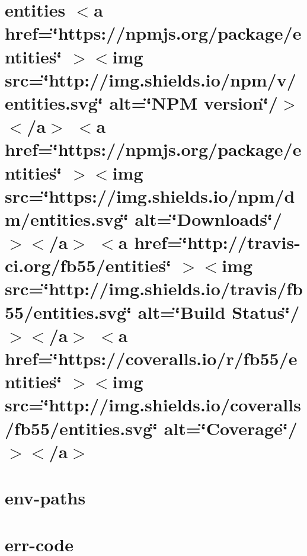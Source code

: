 \documentclass[twoside]{book}
\newcommand{\+}{\discretionary{\mbox{\scriptsize$\hookleftarrow$}}{}{}}
\begin{document}
\chapter{entities \texorpdfstring{$<$}{<}a href=\char`\"{}https\+://npmjs.\+org/package/entities\char`\"{} \texorpdfstring{$>$}{>}\texorpdfstring{$<$}{<}img src=\char`\"{}http\+://img.\+shields.\+io/npm/v/entities.\+svg\char`\"{} alt=\char`\"{}\+NPM version\char`\"{}/\texorpdfstring{$>$}{>}\texorpdfstring{$<$}{<}/a\texorpdfstring{$>$}{>} \texorpdfstring{$<$}{<}a href=\char`\"{}https\+://npmjs.\+org/package/entities\char`\"{} \texorpdfstring{$>$}{>}\texorpdfstring{$<$}{<}img src=\char`\"{}https\+://img.\+shields.\+io/npm/dm/entities.\+svg\char`\"{} alt=\char`\"{}\+Downloads\char`\"{}/\texorpdfstring{$>$}{>}\texorpdfstring{$<$}{<}/a\texorpdfstring{$>$}{>} \texorpdfstring{$<$}{<}a href=\char`\"{}http\+://travis-\/ci.\+org/fb55/entities\char`\"{} \texorpdfstring{$>$}{>}\texorpdfstring{$<$}{<}img src=\char`\"{}http\+://img.\+shields.\+io/travis/fb55/entities.\+svg\char`\"{} alt=\char`\"{}\+Build Status\char`\"{}/\texorpdfstring{$>$}{>}\texorpdfstring{$<$}{<}/a\texorpdfstring{$>$}{>} \texorpdfstring{$<$}{<}a href=\char`\"{}https\+://coveralls.\+io/r/fb55/entities\char`\"{} \texorpdfstring{$>$}{>}\texorpdfstring{$<$}{<}img src=\char`\"{}http\+://img.\+shields.\+io/coveralls/fb55/entities.\+svg\char`\"{} alt=\char`\"{}\+Coverage\char`\"{}/\texorpdfstring{$>$}{>}\texorpdfstring{$<$}{<}/a\texorpdfstring{$>$}{>}}
\label{md__c___users_vaishnavi_jadhav__desktop__developer_code_mean_stack_example_client_node_modules_entities_readme}

\chapter{env-\/paths}
\label{md__c___users_vaishnavi_jadhav__desktop__developer_code_mean_stack_example_client_node_modules_env_paths_readme}

\chapter{err-\/code}
\label{md__c___users_vaishnavi_jadhav__desktop__developer_code_mean_stack_example_client_node_modules_err_code__r_e_a_d_m_e}

\end{document}
